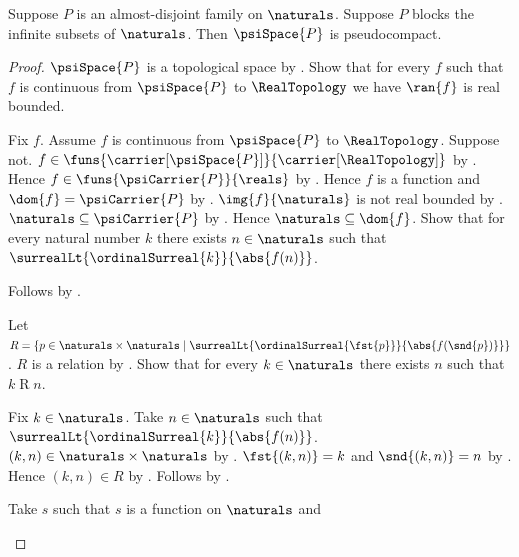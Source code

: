 \begin{theorem}\label{psi_blocking_implies_pseudocompact}
    Suppose $P$ is an almost-disjoint family on $\naturals$.
    Suppose $P$ blocks the infinite subsets of $\naturals$.
    Then $\psiSpace{P}$ is pseudocompact.
\end{theorem}
\begin{proof}
    $\psiSpace{P}$ is a topological space by
        .
    Show that for every $f$ such that
        $f$ is continuous from $\psiSpace{P}$ to $\RealTopology$
        we have $\ran{f}$ is real bounded.
    \begin{subproof}
        Fix $f$.
        Assume $f$ is continuous from $\psiSpace{P}$ to $\RealTopology$.
        Suppose not.
        $f\in\funs{\carrier[\psiSpace{P}]}{\carrier[\RealTopology]}$
            by .
        Hence $f\in\funs{\psiCarrier{P}}{\reals}$ by
            .
        Hence $f$ is a function and $\dom{f}=\psiCarrier{P}$ by
            .
        $\img{f}{\naturals}$ is not real bounded by
            .
        $\naturals\subseteq\psiCarrier{P}$ by
            .
        Hence $\naturals\subseteq\dom{f}$.
        Show that for every natural number $k$ there exists
            $n\in\naturals$ such that
                $\surrealLt{\ordinalSurreal{k}}{\abs{f(n)}}$.
        \begin{subproof}
            Follows by
                .
        \end{subproof}
        Let $R=\{p\in\naturals\times\naturals\mid
            \surrealLt{\ordinalSurreal{\fst{p}}}{\abs{f(\snd{p})}}\}$.
        $R$ is a relation by .
        Show that for every $k\in\naturals$ there exists $n$ such that
            $k\mathrel{R}n$.
        \begin{subproof}
            Fix $k\in\naturals$.
            Take $n\in\naturals$ such that
                $\surrealLt{\ordinalSurreal{k}}{\abs{f(n)}}$.
            $(k,n)\in\naturals\times\naturals$ by
                .
            $\fst{(k,n)}=k$ and $\snd{(k,n)}=n$ by
                .
            Hence $(k,n)\in R$ by \auto.
            Follows by \auto.
        \end{subproof}
        Take $s$ such that $s$ is a function on $\naturals$ and

\end{subproof}
\end{proof}
